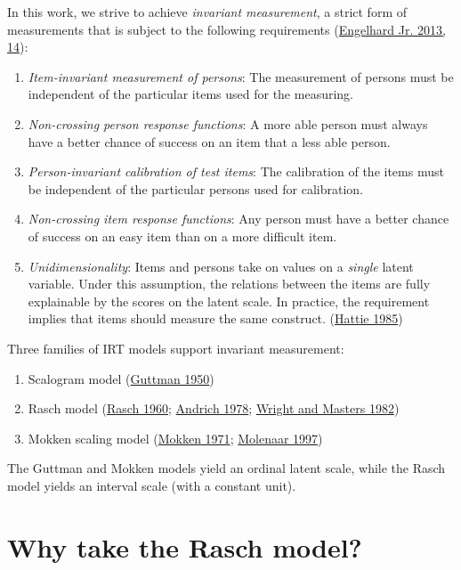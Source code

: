 \documentclass[
]{book}
\providecommand{\tightlist}{%
  \setlength{\itemsep}{0pt}\setlength{\parskip}{0pt}}
\begin{document}
In this work, we strive to achieve \emph{invariant measurement}, a strict form of measurements that is subject to the following requirements (\protect\hyperlink{ref-engelhard2013}{Engelhard Jr. 2013, 14}):

\begin{enumerate}
\def\labelenumi{\arabic{enumi}.}
\tightlist
\item
  \emph{Item-invariant measurement of persons}: The measurement of persons must be independent of the particular items used for the measuring.
\item
  \emph{Non-crossing person response functions}: A more able person must always have a better chance of success on an item that a less able person.
\item
  \emph{Person-invariant calibration of test items}: The calibration of the items must be independent of the particular persons used for calibration.
\item
  \emph{Non-crossing item response functions}: Any person must have a better chance of success on an easy item than on a more difficult item.
\item
  \emph{Unidimensionality}: Items and persons take on values on a \emph{single} latent variable. Under this assumption, the relations between the items are fully explainable by the scores on the latent scale. In practice, the requirement implies that items should measure the same construct. (\protect\hyperlink{ref-hattie1985}{Hattie 1985})
\end{enumerate}

Three families of IRT models support invariant measurement:

\begin{enumerate}
\def\labelenumi{\arabic{enumi}.}
\tightlist
\item
  Scalogram model (\protect\hyperlink{ref-guttman1950}{Guttman 1950})
\item
  Rasch model (\protect\hyperlink{ref-rasch1960}{Rasch 1960}; \protect\hyperlink{ref-andrich1978}{Andrich 1978}; \protect\hyperlink{ref-wright1982}{Wright and Masters 1982})
\item
  Mokken scaling model (\protect\hyperlink{ref-mokken1971}{Mokken 1971}; \protect\hyperlink{ref-molenaar1997}{Molenaar 1997})
\end{enumerate}

The Guttman and Mokken models yield an ordinal latent scale, while the Rasch model yields an interval scale (with a constant unit).

\hypertarget{sec:whyrasch}{%
\section{Why take the Rasch model?}\label{sec:whyrasch}}
\end{document}
